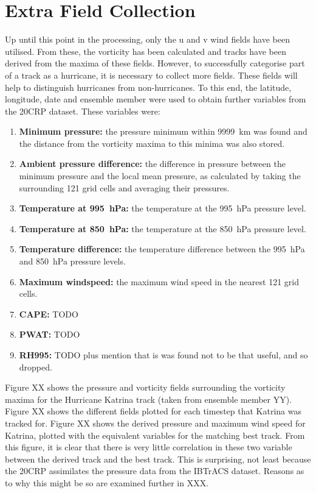 \documentclass[pdftex,12pt,a4paper]{report}
\begin{document}

\newpage
\section{Extra Field Collection}

Up until this point in the processing, only the u and v wind fields have been utilised. From these,
the vorticity has been calculated and tracks have been derived from the maxima of these fields.
However, to successfully categorise part of a track as a hurricane, it is necessary to collect more
fields. These fields will help to distinguish hurricanes from non-hurricanes. To this end, the
latitude, longitude, date and ensemble member were used to obtain further variables from the 20CRP
dataset. These variables were:

\begin{enumerate}
    \item \textbf{Minimum pressure:} the pressure minimum within \SI{9999}{km} was found and the distance
        from the vorticity maxima to this minima was also stored.
    \item \textbf{Ambient pressure difference:} the difference in pressure between the minimum
        pressure and the local mean pressure, as calculated by taking the surrounding 121 grid cells
        and averaging their pressures.
    \item \textbf{Temperature at \SI{995}{hPa}:} the temperature at the \SI{995}{hPa} pressure
        level.
    \item \textbf{Temperature at \SI{850}{hPa}:} the temperature at the \SI{850}{hPa} pressure
        level.
    \item \textbf{Temperature difference:} the temperature difference between the \SI{995}{hPa} and
        \SI{850}{hPa} pressure levels.
    \item \textbf{Maximum windspeed:} the maximum wind speed in the nearest 121 grid cells.
    \item \textbf{CAPE:} TODO
    \item \textbf{PWAT:} TODO
    \item \textbf{RH995:} TODO plus mention that is was found not to be that useful, and so dropped.
\end{enumerate}

Figure XX shows the pressure and vorticity fields surrounding the vorticity maxima for the Hurricane
Katrina track (taken from ensemble member YY). Figure XX shows the different fields plotted for each
timestep that Katrina was tracked for. Figure XX shows the derived pressure and maximum wind speed
for Katrina, plotted with the equivalent variables for the matching best track. From this figure, it
is clear that there is very little correlation in these two variable between the derived track and
the best track. This is surprising, not least because the 20CRP assimilates the pressure data from
the IBTrACS dataset. Reasons as to why this might be so are examined further in XXX.
\end{document}
